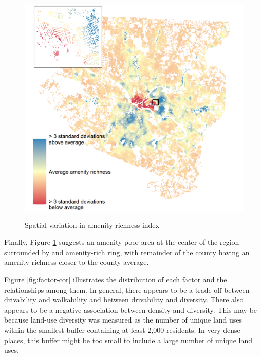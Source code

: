 \documentclass[
]{book}
\begin{document}
\begin{figure}
\includegraphics[width=1\linewidth]{04_figures/amenities} \caption{Spatial variation in amenity-richness index}\label{fig:amenities-map}
\end{figure}

Finally, Figure \ref{fig:amenities-map} suggests an amenity-poor
area at the center of the region surrounded by and amenity-rich ring,
with remainder of the county having an amenity richness closer to the
county average.

Figure \ref{fig:factor-cor} illustrates the distribution of each factor and the
relationships among them. In general, there appears to be a
trade-off between drivability and walkability and between drivability and diversity.
There also appears to be a negative association
between density and diversity. This may be because land-use diversity was measured
as the number of unique land uses
within the smallest buffer containing at least 2,000 residents. In very dense places,
this buffer might be too small to include a large number of unique land uses.
\end{document}
